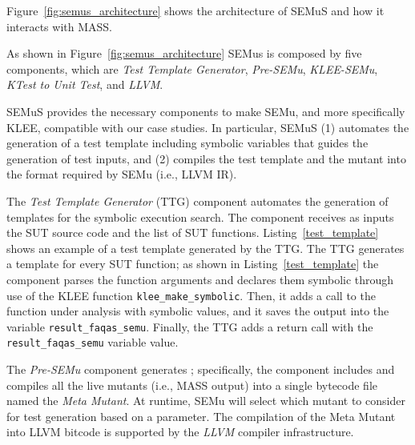 Figure~\ref{fig:semus_architecture} shows the architecture of SEMuS and how it interacts with MASS.


As shown in Figure~\ref{fig:semus_architecture} SEMus is composed by five components, which are \emph{Test Template Generator},  \emph{Pre-SEMu},  \emph{KLEE-SEMu},  \emph{KTest to Unit Test}, and \emph{LLVM}.




SEMuS provides the necessary components to make SEMu, and more specifically KLEE, compatible with our case studies. In particular, SEMuS (1) automates the generation of a test template including symbolic variables that guides the generation of test inputs, and (2) compiles the test template and the mutant into the format required by SEMu (i.e., LLVM IR). 


The \emph{Test Template Generator} (TTG) component automates the generation of templates for the symbolic execution search. The component receives as inputs the SUT source code and the list of SUT functions. 
Listing~\ref{test_template} shows an example of a test template generated by the TTG. The TTG generates a template for every SUT function; as shown in Listing~\ref{test_template} the component parses the function arguments and declares them symbolic through use of the KLEE function \texttt{klee\_make\_symbolic}. Then, it adds a call to the function under analysis with symbolic values, and it saves the output into the variable \texttt{result\_faqas\_semu}. Finally, the TTG adds a return call with the \texttt{result\_faqas\_semu} variable value.

The \emph{Pre-SEMu} component generates ; specifically, the component includes and compiles all the live mutants (i.e., MASS output) into a single bytecode file named the \emph{Meta Mutant}. At runtime, SEMu will select which mutant to consider for test generation based on a parameter. The compilation of the Meta Mutant into LLVM bitcode is supported by the \emph{LLVM} compiler infrastructure. 

